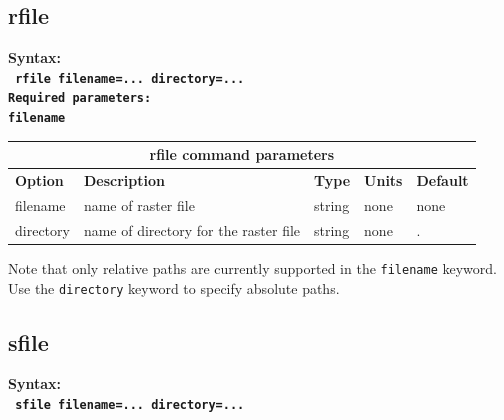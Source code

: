 \documentclass[11pt]{report}
\begin{document}
{

%
\subsection{rfile}
\label{keyword:rfile}
\begin{flushleft}\bf
	Syntax:\\
	\tt
	rfile filename=... directory=...\\
	\bf Required parameters:\\
	\tt filename
\end{flushleft}
%
\begin{center}
	\begin{tabular}{|l|p{8cm}|l|l||l|} \hline
		\multicolumn{5}{|c|}{\bf rfile command parameters}                                              \\ \hline
		{\bf Option} & {\bf Description}                     & {\bf Type} & {\bf Units} & {\bf Default} \\ \hline
		\hline
		filename     & name of raster file                   & string     & none        & none          \\ \hline
		directory    & name of directory for the raster file & string     & none        & .             \\ \hline
	\end{tabular}
\end{center}
Note that only relative paths are currently supported in the \verb+filename+ keyword. Use the
\verb+directory+ keyword to specify absolute paths.


%
\subsection{sfile}
\label{keyword:sfile}
\begin{flushleft}\bf
	Syntax:\\
	\tt
	sfile filename=... directory=...\\


\end{flushleft}}
\end{document}
